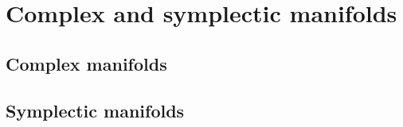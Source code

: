 \documentclass{../../large}
\begin{document}
\part{Complex and symplectic manifolds}

\chapter{Complex manifolds}

\chapter{Symplectic manifolds}

\chapter{}
\end{document}
